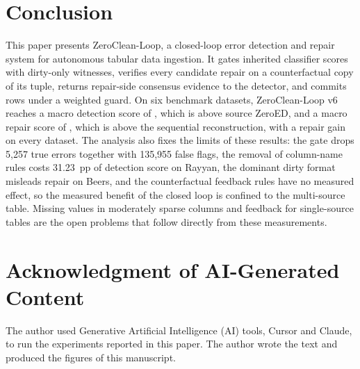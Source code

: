 \documentclass[conference]{IEEEtran}
\begin{document}
\section{Conclusion}
\label{sec:conclusion}

This paper presents ZeroClean-Loop, a closed-loop error detection and repair system for autonomous tabular data ingestion. It gates inherited classifier scores with dirty-only witnesses, verifies every candidate repair on a counterfactual copy of its tuple, returns repair-side consensus evidence to the detector, and commits rows under a weighted guard. On six benchmark datasets, ZeroClean-Loop v6 reaches a macro detection score of \VsixMacroED{}, which is \VsixEDGain{} above source ZeroED, and a macro repair score of \VsixMacroRepair{}, which is \VsixRepairGain{} above the sequential reconstruction, with a repair gain on every dataset. The analysis also fixes the limits of these results: the gate drops 5,257 true errors together with 135,955 false flags, the removal of column-name rules costs 31.23~pp of detection score on Rayyan, the dominant dirty format misleads repair on Beers, and the counterfactual feedback rules have no measured effect, so the measured benefit of the closed loop is confined to the multi-source table. Missing values in moderately sparse columns and feedback for single-source tables are the open problems that follow directly from these measurements.

\section*{Acknowledgment of AI-Generated Content}
The author used Generative Artificial Intelligence (AI) tools, Cursor and Claude, to run the experiments reported in this paper. The author wrote the text and produced the figures of this manuscript.



\end{document}
